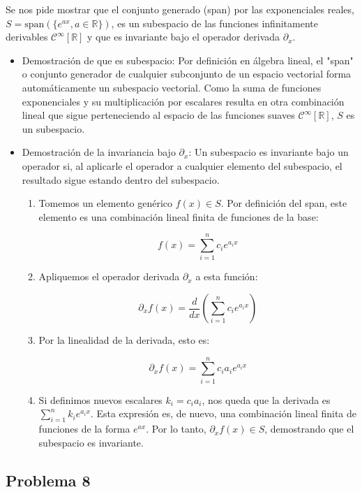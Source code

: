 \documentclass[11pt,spanish]{article}
\begin{document}
Se nos pide mostrar que el conjunto generado (span) por las exponenciales reales, $S = \text{span}(\{e^{ax}, a \in \mathbb{R}\})$, es un subespacio de las funciones infinitamente derivables $\mathcal{C}^{\infty}[\mathbb{R}]$ y que es invariante bajo el operador derivada $\partial_{x}$.

\begin{itemize}
\item Demostración de que es subespacio:
Por definición en álgebra lineal, el "span" o conjunto generador de cualquier subconjunto de un espacio vectorial forma automáticamente un subespacio vectorial. Como la suma de funciones exponenciales y su multiplicación por escalares resulta en otra combinación lineal que sigue perteneciendo al espacio de las funciones suaves $\mathcal{C}^{\infty}[\mathbb{R}]$, $S$ es un subespacio.

\item Demostración de la invariancia bajo $\partial_{x}$:
Un subespacio es invariante bajo un operador si, al aplicarle el operador a cualquier elemento del subespacio, el resultado sigue estando dentro del subespacio.

\begin{enumerate}
\item Tomemos un elemento genérico $f(x) \in S$. Por definición del span, este elemento es una combinación lineal finita de funciones de la base:

$$f(x) = \sum_{i=1}^{n} c_{i} e^{a_{i}x}$$

\item Apliquemos el operador derivada $\partial_{x}$ a esta función:

$$\partial_{x} f(x) = \frac{d}{dx} \left( \sum_{i=1}^{n} c_{i} e^{a_{i}x} \right)$$


\item Por la linealidad de la derivada, esto es:

$$\partial_{x} f(x) = \sum_{i=1}^{n} c_{i} a_{i} e^{a_{i}x}$$

\item Si definimos nuevos escalares $k_{i} = c_{i} a_{i}$, nos queda que la derivada es $\sum_{i=1}^{n} k_{i} e^{a_{i}x}$. Esta expresión es, de nuevo, una combinación lineal finita de funciones de la forma $e^{ax}$.
Por lo tanto, $\partial_{x} f(x) \in S$, demostrando que el subespacio es invariante.
\end{enumerate}
\end{itemize}

\subsection*{Problema 8}
\end{document}
